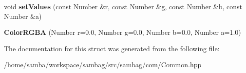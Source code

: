 \begin{DoxyCompactItemize}
\item 
\hypertarget{structsambag_1_1com_1_1_color_r_g_b_a_a1fd195367ff8404bde2e1c738310e825}{
void {\bfseries setValues} (const Number \&r, const Number \&g, const Number \&b, const Number \&a)}
\label{structsambag_1_1com_1_1_color_r_g_b_a_a1fd195367ff8404bde2e1c738310e825}

\item 
\hypertarget{structsambag_1_1com_1_1_color_r_g_b_a_ad774bdeb9be348e02bff1effdc8f42e1}{
{\bfseries ColorRGBA} (Number r=0.0, Number g=0.0, Number b=0.0, Number a=1.0)}
\label{structsambag_1_1com_1_1_color_r_g_b_a_ad774bdeb9be348e02bff1effdc8f42e1}

\end{DoxyCompactItemize}


The documentation for this struct was generated from the following file:\begin{DoxyCompactItemize}
\item 
/home/samba/workspace/sambag/src/sambag/com/Common.hpp\end{DoxyCompactItemize}
